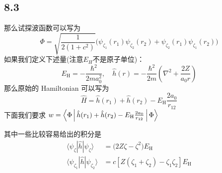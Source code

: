 \subsection{8.3}

那么试探波函数可以写为
\begin{equation}
    \Phi = \sqrt{\frac{1}{2 (1+c^2)}} \big( \psi_{\zeta_1} (r_1) \psi_{\zeta_2} (r_2) + \psi_{\zeta_2} (r_1) \psi_{\zeta_1} (r_2) \big)
\end{equation}
如果我们定义下述量(注意$ E_H $不是原子单位)：
\begin{equation*}
    E_\mathrm{H} = - \frac{\hbar^2}{2 m a_0^2}, \quad \hat h (r) = - \frac{\hbar^2}{2m} \left( \nabla^2 + \frac{2 Z}{a_0 r} \right)
\end{equation*}
那么原始的 Hamiltonian 可以写为%
\begin{equation}
    \hat H = \hat h (r_1) + \hat h (r_2) - E_\mathrm{H} \frac{2 a_0}{r_{12}}
\end{equation}
下面我们要求
$
w = \Braket{\Phi | \hat h (r_1) + \hat h (r_2) - E_\mathrm{H} \frac{2 a_0}{r_{12}} | \Phi }
$

其中一些比较容易给出的积分是
\begin{align}
\langle \psi_\zeta | \hat h | \psi_\zeta \rangle &= \big( 2 Z \zeta - \zeta^2 \big) E_\mathrm{H} \\
\langle \psi_{\zeta_1} | \hat h | \psi_{\zeta_2} \rangle &= c [ Z (\zeta_1 + \zeta_2) - \zeta_1 \zeta_2 ] E_\mathrm{H}
\end{align}




